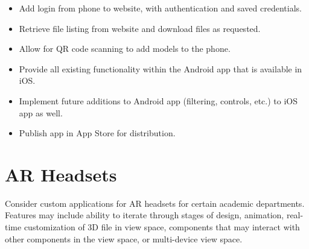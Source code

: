 \begin{enumerate}
\begin{itemize}
                \item Add login from phone to website, with authentication and saved credentials.

                \item Retrieve file listing from website and download files as requested.

                \item Allow for QR code scanning to add models to the phone.

                \item Provide all existing functionality within the Android app that is available in iOS.

                \item Implement future additions to Android app (filtering, controls, etc.) to iOS app as well.

                \item Publish app in App Store for distribution.

            \end{itemize}
        \end{enumerate}

    \section{AR Headsets}

    Consider custom applications for AR headsets for certain academic departments. Features may include ability to iterate through stages of design, animation, real-time customization of 3D file in view space, components that may interact with other components in the view space, or multi-device view space. 